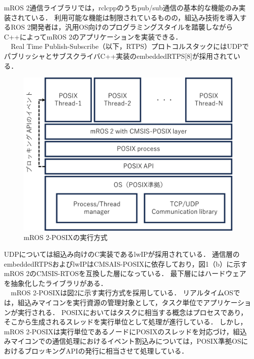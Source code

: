 \documentclass[11pt]{ujarticle}
\begin{document}
mROS 2通信ライブラリでは，rclcppのうちpub/sub通信の基本的な機能のみ実装されている．
利用可能な機能は制限されているものの，組込み技術を導入するROS 2開発者は，汎用OS向けのプログラミングスタイルを踏襲しながらC++によってmROS 2のアプリケーションを実装できる．
\\　Real Time Publish-Subscribe（以下，RTPS）プロトコルスタックにはUDPでパブリッシャとサブスクライバC++実装のembeddedRTPS[8]が採用されている．
\begin{figure}[t]
	\centering
	\includegraphics[width=0.6\linewidth]{./src/fig2_execution_structure.png}
	\caption{mROS 2-POSIXの実行方式}
  \label{fig:arch}
\end{figure}
UDPについては組込み向けのC実装であるlwIPが採用されている．
通信層のembeddedRTPSおよびlwIPはCMSAIS-POSIXに依存しており，図1（b）に示すmROS 2のCMSIS-RTOSを互換した層になっている．
最下層にはハードウェアを抽象化したライブラリがある．
\\　mROS 2-POSIXは図2に示す実行方式を採用している．
リアルタイムOSでは，組込みマイコンを実行資源の管理対象として，タスク単位でアプリケーションが実行される．
POSIXにおいてはタスクに相当する概念はプロセスであり，そこから生成されるスレッドを実行単位として処理が進行している．
しかし，mROS 2-POSIXは実行単位であるノードにPOSIXのスレッドを対応づけ，組込みマイコンでの通信処理におけるイベント割込みについては，POSIX準拠OSにおけるブロッキングAPIの発行に相当させて処理している．
\end{document}
